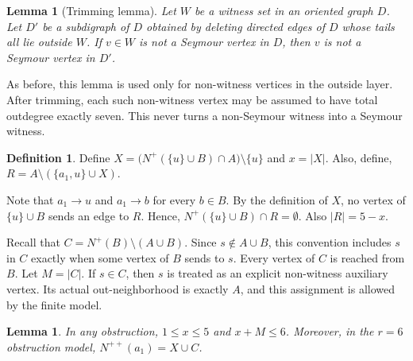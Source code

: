 \documentclass[a4paper,fleqn]{cas-sc}
\newtheorem{lemma}[theorem]{Lemma}
\theoremstyle{definition}
\newtheorem{definition}[theorem]{Definition}
\begin{document}
\begin{lemma}[Trimming lemma]\label{lem:recalltrimming}
Let $W$ be a witness set in an oriented graph $D$.  Let $D'$ be a subdigraph of $D$ obtained by deleting directed edges of $D$ whose tails all lie outside $W$.  If $v\in W$ is not a Seymour vertex in $D$, then $v$ is not a Seymour vertex in $D'$.
\end{lemma}

As before, this lemma is used only for non-witness vertices in the outside layer. After trimming, each such non-witness vertex may be assumed to have total outdegree exactly seven. This never turns a non-Seymour witness into a Seymour witness.

\begin{definition}
Define $X=\bigl(N^+(\{u\}\cup B)\cap A\bigr)\setminus\{u\}$ and
$x=|X|$. Also, define, $R=A\setminus(\{a_1,u\}\cup X).$
\end{definition}

Note that $a_1\to u$ and $a_1\to b$ for every $b\in B$. By the definition of $X$, no vertex of $\{u\}\cup B$ sends an edge to $R$. Hence, $N^+(\{u\}\cup B)\cap R=\emptyset.$ Also $|R|=5-x$.

Recall that $C=N^+(B)\setminus(A\cup B)$. Since $s\notin A\cup B$, this convention includes $s$ in $C$ exactly when some vertex of $B$ sends to $s$. Every vertex of $C$ is reached from $B$. Let $M=|C|$.
If $s\in C$, then $s$ is treated as an explicit non-witness auxiliary vertex. Its actual out-neighborhood is exactly $A$, and this assignment is allowed by the finite model.

\begin{lemma}\label{lem:xM}
In any obstruction, $1\le x\le 5$ and $x+M\le 6$.
Moreover, in the $r=6$ obstruction model, $N^{++}(a_1)=X\cup C$.
\end{lemma}
\end{document}
